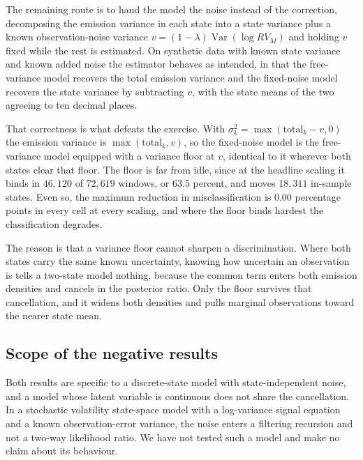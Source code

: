 The remaining route is to hand the model the noise instead of the correction,
decomposing the emission variance in each state into a state variance plus a
known observation-noise variance $v = (1-\lambda)\operatorname{Var}(\log RV_M)$
and holding $v$ fixed while the rest is estimated. On synthetic data with known
state variance and known added noise the estimator behaves as intended, in that
the free-variance model recovers the total emission variance and the fixed-noise
model recovers the state variance by subtracting $v$, with the state means of the
two agreeing to ten decimal places.

That correctness is what defeats the exercise. With
$\sigma_k^2 = \max(\text{total}_k - v, 0)$ the emission variance is
$\max(\text{total}_k, v)$, so the fixed-noise model is the free-variance model
equipped with a variance floor at $v$, identical to it wherever both states clear
that floor. The floor is far from idle, since at the headline scaling it binds in
$46{,}120$ of $72{,}619$ windows, or $63.5$ percent, and moves $18{,}311$ %
in-sample states. Even so, the maximum reduction in misclassification is $0.00$ %
percentage points in every cell at every scaling, and where the floor binds %
hardest the classification degrades.

The reason is that a variance floor cannot sharpen a discrimination. Where both
states carry the same known uncertainty, knowing how uncertain an observation is
tells a two-state model nothing, because the common term enters both emission
densities and cancels in the posterior ratio. Only the floor survives that
cancellation, and it widens both densities and pulls marginal observations toward
the nearer state mean.

\subsection{Scope of the negative results}

Both results are specific to a discrete-state model with state-independent noise,
and a model whose latent variable is continuous does not share the cancellation.
In a
stochastic volatility state-space model with a log-variance signal equation and a
known observation-error variance, the noise enters a filtering recursion and not
a two-way likelihood ratio. We have not tested such a model and make no claim
about its behaviour.
